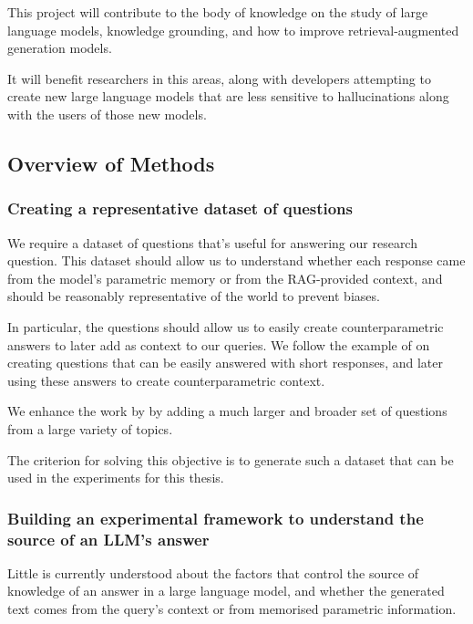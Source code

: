 This project will contribute to the body of knowledge on the study of large language models, knowledge grounding, and how to improve retrieval-augmented generation models.

It will benefit researchers in this areas, along with developers attempting to create new large language models that are less sensitive to hallucinations along with the users of those new models.

\subsection{Overview of Methods}

\subsubsection{Creating a representative dataset of questions}
\label{questions_objective}

We require a dataset of questions that's useful for answering our research question.
This dataset should allow us to understand whether each response came from the model's parametric memory or from the RAG-provided context, and should be reasonably representative of the world to prevent biases.

In particular, the questions should allow us to easily create counterparametric answers to later add as context to our queries.
We follow the example of \citeauthor{factual_recall} on creating questions that can be easily answered with short responses, and later using these answers to create counterparametric context.

We enhance the work by \citeauthor{factual_recall} by adding a much larger and broader set of questions from a large variety of topics.

The criterion for solving this objective is to generate such a dataset that can be used in the experiments for this thesis.

\subsubsection{Building an experimental framework to understand the source of an LLM's answer}
\label{intro_models_numbers}

Little is currently understood about the factors that control the source of knowledge of an answer in a large language model, and whether the generated text comes from the query's context or from memorised parametric information.

